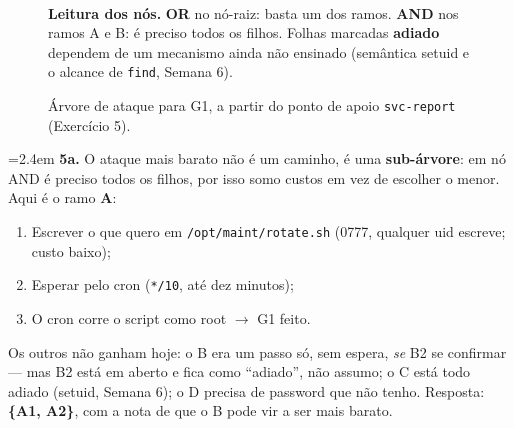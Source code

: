 \documentclass[a4paper,11pt]{article}
\newenvironment{answer}[1]{%
  \par\addvspace{7pt}\noindent
  \hangindent=2.4em\hangafter=1
  {\color{sscnblue}\bfseries #1\hspace{0.55em}}\ignorespaces}
  {\par\addvspace{5pt}}
\newcommand{\cmd}[1]{\textcolor{sscnblue}{\texttt{#1}}}
\begin{document}
\begin{figure}[H]
\\[4pt]
{\footnotesize\textbf{Leitura dos n\'os.} \textbf{OR} no n\'o-raiz: basta um dos ramos.
\textbf{AND} nos ramos A e B: \'e preciso todos os filhos. Folhas marcadas
\textbf{adiado} dependem de um mecanismo ainda n\~{a}o ensinado (sem\^{a}ntica setuid e o
alcance de \cmd{find}, Semana 6).}
\caption{\'Arvore de ataque para G1, a partir do ponto de apoio \texttt{svc-report} (Exerc\'{i}cio 5).}
\label{fig:arvore}
\end{figure}

\begin{answer}{5a.}
O ataque mais barato n\~ao \'e um caminho, \'e uma \textbf{sub-\'arvore}: em n\'o AND
\'e preciso todos os filhos, por isso somo custos em vez de escolher o menor. Aqui
\'e o ramo \textbf{A}:

\begin{enumerate}
\item Escrever o que quero em \cmd{/opt/maint/rotate.sh} (0777, qualquer uid escreve;
custo baixo);
\item Esperar pelo cron (\texttt{*/10}, at\'e dez minutos);
\item O cron corre o script como root $\rightarrow$ G1 feito.
\end{enumerate}

Os outros n\~ao ganham hoje: o B era um passo s\'o, sem espera, \emph{se} B2 se
confirmar --- mas B2 est\'a em aberto e fica como ``adiado'', n\~ao assumo; o C est\'a
todo adiado (setuid, Semana 6); o D precisa de password que n\~ao tenho. Resposta:
\textbf{\{A1, A2\}}, com a nota de que o B pode vir a ser mais barato.
\end{answer}
\end{document}
